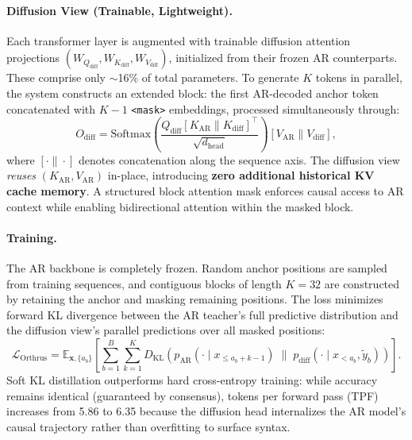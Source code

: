 \documentclass[11pt,a4paper]{article}
\begin{document}
\paragraph{Diffusion View (Trainable, Lightweight).} Each transformer layer is augmented with trainable diffusion attention projections $(W_{Q_{\mathrm{diff}}}, W_{K_{\mathrm{diff}}}, W_{V_{\mathrm{diff}}})$, initialized from their frozen AR counterparts. These comprise only ${\sim}$16\% of total parameters. To generate $K$ tokens in parallel, the system constructs an extended block: the first AR-decoded anchor token concatenated with $K{-}1$ \texttt{<mask>} embeddings, processed simultaneously through:
\begin{equation}
O_{\mathrm{diff}} = \mathrm{Softmax}\!\left(\frac{Q_{\mathrm{diff}} [K_{\mathrm{AR}} \| K_{\mathrm{diff}}]^\top}{\sqrt{d_{\mathrm{head}}}}\right) [V_{\mathrm{AR}} \| V_{\mathrm{diff}}],
\end{equation}
where $[\cdot \| \cdot]$ denotes concatenation along the sequence axis. The diffusion view \textit{reuses} $(K_{\mathrm{AR}}, V_{\mathrm{AR}})$ in-place, introducing \textbf{zero additional historical KV cache memory}. A structured block attention mask enforces causal access to AR context while enabling bidirectional attention within the masked block.

\paragraph{Training.} The AR backbone is completely frozen. Random anchor positions are sampled from training sequences, and contiguous blocks of length $K{=}32$ are constructed by retaining the anchor and masking remaining positions. The loss minimizes forward KL divergence between the AR teacher's full predictive distribution and the diffusion view's parallel predictions over all masked positions:
\begin{equation}
\mathcal{L}_{\mathrm{Orthrus}} = \mathbb{E}_{\mathbf{x}, \{a_b\}} \left[\sum_{b=1}^{B} \sum_{k=1}^{K} D_{\mathrm{KL}}\!\left(p_{\mathrm{AR}}(\cdot \mid x_{\leq a_b+k-1}) \;\|\; p_{\mathrm{diff}}(\cdot \mid x_{<a_b}, \tilde{y}_b)\right)\right].
\end{equation}
Soft KL distillation outperforms hard cross-entropy training: while accuracy remains identical (guaranteed by consensus), tokens per forward pass (TPF) increases from 5.86 to 6.35 because the diffusion head internalizes the AR model's causal trajectory rather than overfitting to surface syntax.
\end{document}
